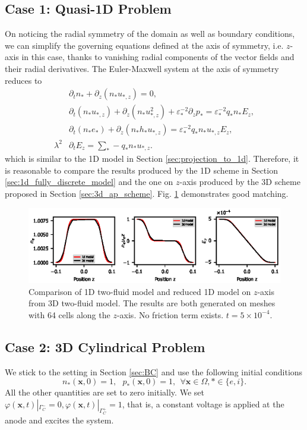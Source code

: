 \documentclass{article}
\begin{document}
\subsection{Case 1: Quasi-1D Problem}
On noticing the radial symmetry of the domain as well as boundary conditions, we can simplify the governing equations defined at the axis of symmetry, i.e. $z$-axis in this case, thanks to vanishing radial components of the vector fields and their radial derivatives. The Euler-Maxwell system at the axis of symmetry reduces to
\begin{align*}
    &\partial_t n_* + \partial_z(n_*u_{*,z}) = 0, \\
    &\partial_t (n_* u_{*,z}) + \partial_z(n_*u_{*,z}^2) + \varepsilon_*^{-2} \partial_z p_* = \varepsilon_*^{-2}q_*n_*E_z, \\
    &\partial_t (n_*e_*) + \partial_z (n_* h_* u_{*,z}) = \varepsilon_*^{-2} q_* n_* u_{*,z} E_z, \\
    \lambda^2 &\partial_t E_z = \sum_* - q_* n_* u_{*,z}.
\end{align*}
which is similar to the 1D model in Section \ref{sec:projection_to_1d}. Therefore, it is reasonable to compare the results produced by the 1D scheme in Section \ref{sec:1d_fully_discrete_model} and the one on $z$-axis produced by the 3D scheme proposed in Section \ref{sec:3d_ap_scheme}. Fig. \ref{fig:z_axis_reduction} demonstrates good matching. 
\begin{figure}
    \centering
    \includegraphics{z_axis_reduction.eps}
    \caption{Comparison of 1D two-fluid model and reduced 1D model on $z$-axis from 3D two-fluid model. The results are both generated on meshes with 64 cells along the $z$-axis. No friction term exists. $t = 5 \times 10^{-4}.$}
    \label{fig:z_axis_reduction}
\end{figure}

\subsection{Case 2: 3D Cylindrical Problem}

We stick to the setting in Section \ref{sec:BC} and use the following initial conditions
\begin{equation*}
    n_\ast(\mathbf{x}, 0) = 1, \ \ \  p_\ast(\mathbf{x},0) = 1, \ \ \forall \mathbf{x}\in\Omega, \ast \in \{e, i\}.
\end{equation*}
All the other quantities are set to zero initially. We set $\varphi(\mathbf{x}, t)|_{\Gamma_C^-} = 0, \varphi(\mathbf{x}, t)|_{\Gamma_C^+} = 1$, that is, a constant voltage is applied at the anode and excites the system. 
\end{document}
